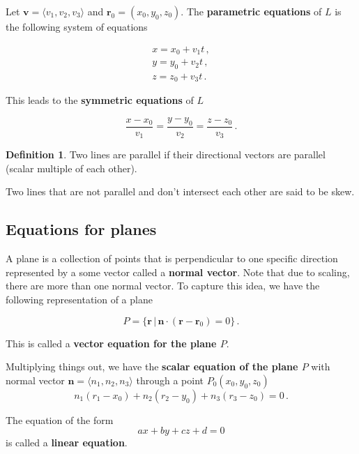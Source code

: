 \documentclass[
]{article}
\theoremstyle{definition}
\newtheorem{definition}{Definition}[section]
\theoremstyle{definition}
\theoremstyle{definition}
\theoremstyle{definition}
\theoremstyle{remark}
\begin{document}
Let \(\mathbf{v} = \langle v_1, v_2, v_3 \rangle\) and \(\mathbf{r}_0 = ( x_0, y_0, z_0 )\).
The \textbf{parametric equations} of \(L\) is the following system of equations

\begin{gather*}
    x = x_0 + v_1 t\,, \\
    y = y_0 + v_2 t\,, \\
    z = z_0 + v_3 t \,. 
\end{gather*}

This leads to the \textbf{symmetric equations} of \(L\)

\begin{equation*}
    \frac{x - x_0}{v_1} = \frac{y - y_0}{v_2} = \frac{z - z_0}{v_3} \,.
\end{equation*}

\begin{definition}
Two lines are parallel if their directional vectors are parallel (scalar multiple of each other).

Two lines that are not parallel and don't intersect each other are said to be skew.
\end{definition}

\subsection{Equations for planes}\label{equations-for-planes}

A plane is a collection of points that is perpendicular to one specific direction
represented by a some vector called a \textbf{normal vector}.
Note that due to scaling, there are more than one normal vector.
To capture this idea, we have the following representation of a plane

\begin{equation*}
    P = \{ \mathbf{r} \, | \, \mathbf{n} \cdot (\mathbf{r}- \mathbf{r}_0 ) = 0 \} \,.
\end{equation*}

This is called a \textbf{vector equation for the plane \(P\)}.

Multiplying things out, we have the \textbf{scalar equation of the plane \(P\)} with
normal vector \(\mathbf{n} = \langle n_1, n_2, n_3 \rangle\) through a point \(P_0(x_0, y_0, z_0)\)
\begin{equation*}
    n_1(r_1- x_0) + n_2 (r_2 - y_0) + n_3(r_3 - z_0) = 0 \,.
\end{equation*}

The equation of the form
\begin{equation*}
    ax + by + cz + d = 0 
\end{equation*}
is called a \textbf{linear equation}.
\end{document}

